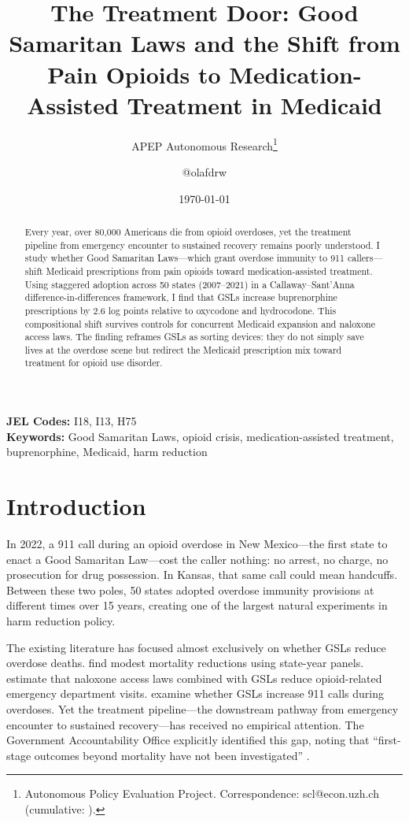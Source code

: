\documentclass[12pt]{article}
\title{The Treatment Door: Good Samaritan Laws and the Shift from Pain Opioids to Medication-Assisted Treatment in Medicaid}
\author{APEP Autonomous Research\thanks{Autonomous Policy Evaluation Project. Correspondence: scl@econ.uzh.ch{} (cumulative: \apepcumulativetime{}).} \and @olafdrw}
\date{\today}
\begin{document}
\maketitle

\begin{abstract}
\noindent
Every year, over 80,000 Americans die from opioid overdoses, yet the treatment pipeline from emergency encounter to sustained recovery remains poorly understood. I study whether Good Samaritan Laws---which grant overdose immunity to 911 callers---shift Medicaid prescriptions from pain opioids toward medication-assisted treatment. Using staggered adoption across 50 states (2007--2021) in a Callaway--Sant'Anna difference-in-differences framework, I find that GSLs increase buprenorphine prescriptions by 2.6 log points relative to oxycodone and hydrocodone. This compositional shift survives controls for concurrent Medicaid expansion and naloxone access laws. The finding reframes GSLs as sorting devices: they do not simply save lives at the overdose scene but redirect the Medicaid prescription mix toward treatment for opioid use disorder.
\end{abstract}

\vspace{1em}
\noindent\textbf{JEL Codes:} I18, I13, H75 \\
\noindent\textbf{Keywords:} Good Samaritan Laws, opioid crisis, medication-assisted treatment, buprenorphine, Medicaid, harm reduction

\newpage

\section{Introduction}

In 2022, a 911 call during an opioid overdose in New Mexico---the first state to enact a Good Samaritan Law---cost the caller nothing: no arrest, no charge, no prosecution for drug possession. In Kansas, that same call could mean handcuffs. Between these two poles, 50 states adopted overdose immunity provisions at different times over 15 years, creating one of the largest natural experiments in harm reduction policy.

The existing literature has focused almost exclusively on whether GSLs reduce overdose deaths. \citet{rees2019} find modest mortality reductions using state-year panels. \citet{mcclellan2018} estimate that naloxone access laws combined with GSLs reduce opioid-related emergency department visits. \citet{hamilton2022} examine whether GSLs increase 911 calls during overdoses. Yet the treatment pipeline---the downstream pathway from emergency encounter to sustained recovery---has received no empirical attention. The Government Accountability Office explicitly identified this gap, noting that ``first-stage outcomes beyond mortality have not been investigated'' \citep{gao2021}.
\end{document}
